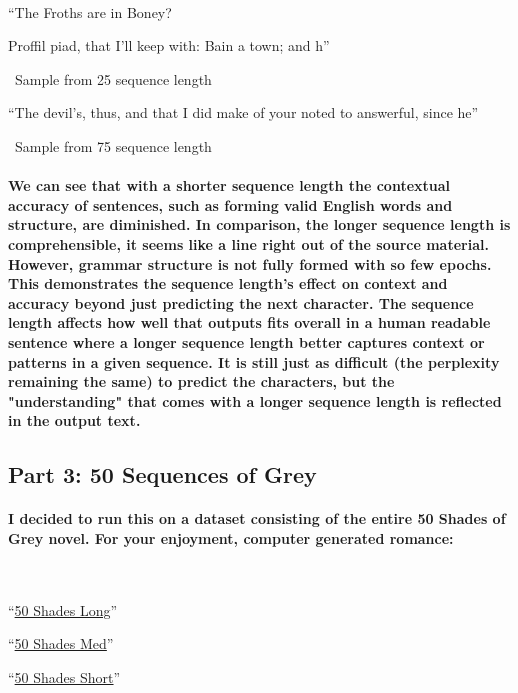 \documentclass[10pt,a4paper]{report}
\begin{document}
\
\vspace{5mm}

``The Froths are in Boney?

Proffil
piad, that I'll keep with:
Bain a town; and h''

\ 
Sample from 25 sequence length
\vspace{5mm}

``The devil's, thus, and that I did make of your noted to answerful, since he''

\ 
Sample from 75 sequence length
\

\paragraph{
We can see that with a shorter sequence length the contextual accuracy of sentences, such as forming valid English words and structure, are diminished. In comparison, the longer sequence length is comprehensible, it seems like a line right out of the source material. However, grammar structure is not fully formed with so few epochs. This demonstrates the sequence length's effect on context and accuracy beyond just predicting the next character. The sequence length affects how well that outputs fits overall in a human readable sentence where a longer sequence length better captures context or patterns in a given sequence. It is still just as difficult (the perplexity remaining the same) to predict the characters, but the "understanding" that comes with a longer sequence length is reflected in the output text.
}

\clearpage

\subsection{Part 3: 50 Sequences of Grey}

\paragraph{I decided to run this on a dataset consisting of the entire 50 Shades of Grey novel. For your enjoyment, computer generated romance:}
\
\vspace{5mm}

``\href{https://raw.githubusercontent.com/AlexKShah/MSCS692/master/midterm/output/50shades-long.txt}{50 Shades Long}''

\vspace{5mm}

``\href{https://raw.githubusercontent.com/AlexKShah/MSCS692/master/midterm/output/50shades.txt}{50 Shades Med}''

\vspace{5mm}

``\href{https://raw.githubusercontent.com/AlexKShah/MSCS692/master/midterm/output/50shades-short.txt}{50 Shades Short}''
\
\end{document}
